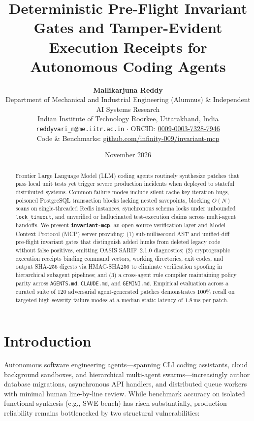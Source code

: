 \documentclass[11pt,a4paper]{article}
\title{\textbf{Deterministic Pre-Flight Invariant Gates and Tamper-Evident Execution Receipts for Autonomous Coding Agents}}
\author{
  \textbf{Mallikarjuna Reddy} \\
  Department of Mechanical and Industrial Engineering (Alumnus) \& Independent AI Systems Research \\
  Indian Institute of Technology Roorkee, Uttarakhand, India \\
  \texttt{reddyvari\_m@me.iitr.ac.in} $\cdot$ ORCID: \href{https://orcid.org/0009-0003-7328-7946}{0009-0003-7328-7946} \\
  Code \& Benchmarks: \href{https://github.com/infinity-009/invariant-mcp}{github.com/infinity-009/invariant-mcp}
}
\date{November 2026}
\begin{document}
\maketitle

\begin{abstract}
Frontier Large Language Model (LLM) coding agents routinely synthesize patches that pass local unit tests yet trigger severe production incidents when deployed to stateful distributed systems. Common failure modes include silent cache-key iteration bugs, poisoned PostgreSQL transaction blocks lacking nested savepoints, blocking $O(N)$ scans on single-threaded Redis instances, synchronous schema locks under unbounded \texttt{lock\_timeout}, and unverified or hallucinated test-execution claims across multi-agent handoffs. We present \textbf{\texttt{invariant-mcp}}, an open-source verification layer and Model Context Protocol (MCP) server providing: (1) sub-millisecond AST and unified-diff pre-flight invariant gates that distinguish added hunks from deleted legacy code without false positives, emitting OASIS SARIF~2.1.0 diagnostics; (2) cryptographic execution receipts binding command vectors, working directories, exit codes, and output SHA-256 digests via HMAC-SHA256 to eliminate verification spoofing in hierarchical subagent pipelines; and (3) a cross-agent rule compiler maintaining policy parity across \texttt{AGENTS.md}, \texttt{CLAUDE.md}, and \texttt{GEMINI.md}. Empirical evaluation across a curated suite of 120 adversarial agent-generated patches demonstrates 100\% recall on targeted high-severity failure modes at a median static latency of $1.8\,\text{ms}$ per patch.
\end{abstract}

\section{Introduction}
Autonomous software engineering agents---spanning CLI coding assistants, cloud background sandboxes, and hierarchical multi-agent swarms---increasingly author database migrations, asynchronous API handlers, and distributed queue workers with minimal human line-by-line review. While benchmark accuracy on isolated functional synthesis (e.g., SWE-bench) has risen substantially, production reliability remains bottlenecked by two structural vulnerabilities:
\end{document}
